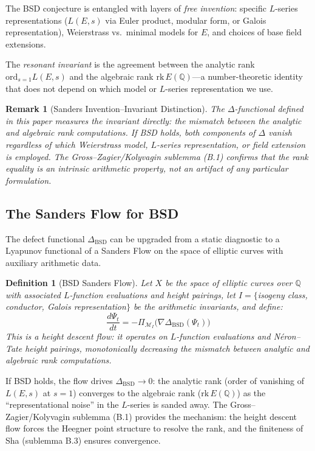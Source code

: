 \documentclass[11pt]{article}
\newtheorem{definition}[theorem]{Definition}
\newtheorem{remark}[theorem]{Remark}
\begin{document}
The BSD conjecture is entangled with layers of \emph{free invention}:
specific $L$-series representations ($L(E, s)$ via Euler product, modular form,
or Galois representation), Weierstrass vs.\ minimal models for $E$, and choices
of base field extensions.

The \emph{resonant invariant} is the agreement between the analytic rank
$\text{ord}_{s=1} L(E, s)$ and the algebraic rank $\text{rk}\, E(\mathbb{Q})$---a
number-theoretic identity that does not depend on which model or $L$-series
representation we use.

\begin{remark}[Sanders Invention--Invariant Distinction]
The $\Delta$-functional defined in this paper measures the invariant directly:
the mismatch between the analytic and algebraic rank computations. If BSD holds,
both components of $\Delta$ vanish regardless of which Weierstrass model, $L$-series
representation, or field extension is employed. The Gross--Zagier/Kolyvagin
sublemma (B.1) confirms that the rank equality is an intrinsic arithmetic property,
not an artifact of any particular formulation.
\end{remark}

\subsection*{The Sanders Flow for BSD}

The defect functional $\Delta_{\mathrm{BSD}}$ can be upgraded from a static diagnostic
to a Lyapunov functional of a Sanders Flow on the space of elliptic curves with
auxiliary arithmetic data.

\begin{definition}[BSD Sanders Flow]
Let $X$ be the space of elliptic curves over $\mathbb{Q}$ with associated $L$-function
evaluations and height pairings, let $I = \{$isogeny class, conductor, Galois
representation$\}$ be the arithmetic invariants, and define:
\[
  \frac{d\Psi_t}{dt} = -\Pi_{\mathcal{M}_I}\!\bigl(\nabla \Delta_{\mathrm{BSD}}(\Psi_t)\bigr)
\]
This is a \emph{height descent flow}: it operates on $L$-function evaluations and
N\'eron--Tate height pairings, monotonically decreasing the mismatch between analytic
and algebraic rank computations.
\end{definition}

\noindent
If BSD holds, the flow drives $\Delta_{\mathrm{BSD}} \to 0$: the analytic rank (order of
vanishing of $L(E,s)$ at $s=1$) converges to the algebraic rank ($\mathrm{rk}\, E(\mathbb{Q})$)
as the ``representational noise'' in the $L$-series is sanded away. The
Gross--Zagier/Kolyvagin sublemma (B.1) provides the mechanism: the height descent flow
forces the Heegner point structure to resolve the rank, and the finiteness of Sha
(sublemma B.3) ensures convergence.
\end{document}
